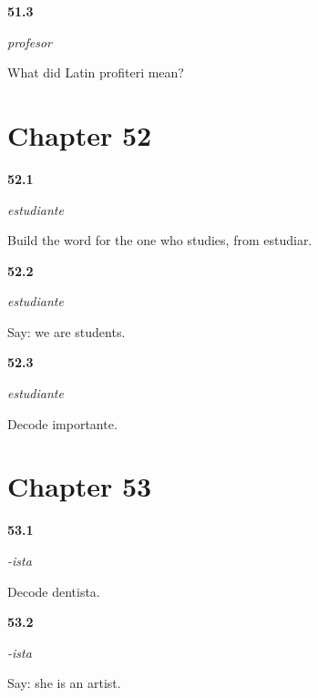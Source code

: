 \noindent\begin{minipage}[t]{\linewidth}
\raggedright
\hypertarget{review-ES-C09-profesor-cousin}{\textbf{51.3}} \emph{profesor}\par
\small What did Latin profiteri mean?
\end{minipage}\par\medskip

\section*{Chapter 52}

\noindent\begin{minipage}[t]{\linewidth}
\raggedright
\hypertarget{review-ES-C09-estudiante-build}{\textbf{52.1}} \emph{estudiante}\par
\small Build the word for the one who studies, from estudiar.
\end{minipage}\par\medskip

\noindent\begin{minipage}[t]{\linewidth}
\raggedright
\hypertarget{review-ES-C09-estudiante-we}{\textbf{52.2}} \emph{estudiante}\par
\small Say: we are students.
\end{minipage}\par\medskip

\noindent\begin{minipage}[t]{\linewidth}
\raggedright
\hypertarget{review-ES-C09-estudiante-decode}{\textbf{52.3}} \emph{estudiante}\par
\small Decode importante.
\end{minipage}\par\medskip

\section*{Chapter 53}

\noindent\begin{minipage}[t]{\linewidth}
\raggedright
\hypertarget{review-ES-C09-ista-decode}{\textbf{53.1}} \emph{-ista}\par
\small Decode dentista.
\end{minipage}\par\medskip

\noindent\begin{minipage}[t]{\linewidth}
\raggedright
\hypertarget{review-ES-C09-ista-say}{\textbf{53.2}} \emph{-ista}\par
\small Say: she is an artist.
\end{minipage}\par\medskip

